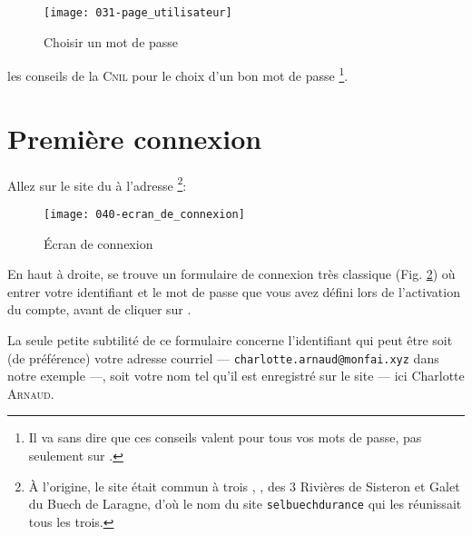 \begin{center}
\end{center}
\begin{figure}
    \texttt{[image: 031-page\_utilisateur]}
    \caption{Choisir un mot de passe}
    \label{fig:choisirMdp}
\end{figure}
\medskip
les conseils de la \textsc{Cnil} pour le choix d’un bon mot de passe%
\footnote{Il va sans dire que ces conseils valent pour tous vos mots de passe, pas seulement sur \CF.}.

\section{Première connexion}

Allez sur le site du \CdS à l’adresse%
\footnote{À l'origine, le site était commun à trois \sel, \CdS, \sel des 3 Rivières de Sisteron et Galet du Buech de Laragne, d'où le nom du site \texttt{selbuechdurance} qui les réunissait tous les trois.}:
\begin{center}
\end{center}

\medskip

\begin{figure}
    \centering
    \texttt{[image: 040-ecran\_de\_connexion]}
    \caption{Écran de connexion}
    \label{fig:ecranConnexion}
\end{figure}
En haut à droite, se trouve un formulaire de connexion très classique (Fig. \ref{fig:ecranConnexion}) où entrer votre identifiant et le mot de passe que vous avez défini lors de l’activation du compte, avant de cliquer sur .

La seule petite subtilité de ce formulaire concerne l’identifiant qui peut être soit (de préférence) votre adresse courriel --- \texttt{charlotte.arnaud@monfai.xyz} dans notre exemple ---, soit votre nom tel qu’il est enregistré sur le site ---  ici Charlotte \textsc{Arnaud}.


